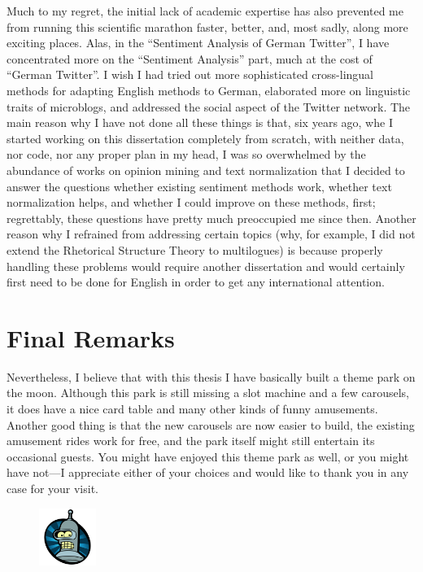Much to my regret, the initial lack of academic expertise has also
prevented me from running this scientific marathon faster, better,
and, most sadly, along more exciting places.  Alas, in the ``Sentiment
Analysis of German Twitter'', I have concentrated more on the
``Sentiment Analysis'' part, much at the cost of ``German Twitter''.
I wish I had tried out more sophisticated cross-lingual methods for
adapting English methods to German, elaborated more on linguistic
traits of microblogs, and addressed the social aspect of the Twitter
network.  The main reason why I have not done all these things is
that, six years ago, whe I started working on this dissertation
completely from scratch, with neither data, nor code, nor any proper
plan in my head, I was so overwhelmed by the abundance of works on
opinion mining and text normalization that I decided to answer the
questions whether existing sentiment methods work, whether text
normalization helps, and whether I could improve on these methods,
first; regrettably, these questions have pretty much preoccupied me
since then.  Another reason why I refrained from addressing certain
topics (why, for example, I did not extend the Rhetorical Structure
Theory to multilogues) is because properly handling these problems
would require another dissertation and would certainly first need to
be done for English in order to get any international attention.


\section*{Final Remarks}

Nevertheless, I believe that with this thesis I have basically built a
theme park on the moon.  Although this park is still missing a slot
machine and a few carousels, it does have a nice card table and many
other kinds of funny amusements.  Another good thing is that the new
carousels are now easier to build, the existing amusement rides work
for free, and the park itself might still entertain its occasional
guests.  You might have enjoyed this theme park as well, or you might
have not---I appreciate either of your choices and would like to thank
you in any case for your visit.
\begin{figure}[htb]
  \centering \includegraphics[height=5em]{img/bender.png}
\end{figure}
